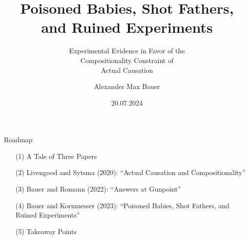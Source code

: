 \documentclass[xcolor=table,9pt,aspectratio=169]{beamer}
\title{Poisoned Babies, Shot Fathers,\\and Ruined Experiments}
\subtitle{Experimental Evidence in Favor of the\\Compositionality Constraint of\\Actual Causation}
\author{Alexander Max Bauer}
\date{20.07.2024}
\begin{document}
{
\begin{frame}
   \maketitle
\end{frame}
}


\begin{frame}{\vspace*{10mm}Roadmap}
\vspace*{-5mm}
\begin{itemize}
   \item[(1)] A Tale of Three Papers
   \item[(2)] Livengood and Sytsma (2020): ``Actual Causation and Compositionality''
   \item[(3)] Bauer and Romann (2022): ``Answers at Gunpoint''
   \item[(4)] Bauer and Kornmesser (2023): ``Poisoned Babies, Shot Fathers, and Ruined Experiments''
   \item[(5)] Takeaway Points
\end{itemize}
\end{frame}
\end{document}
